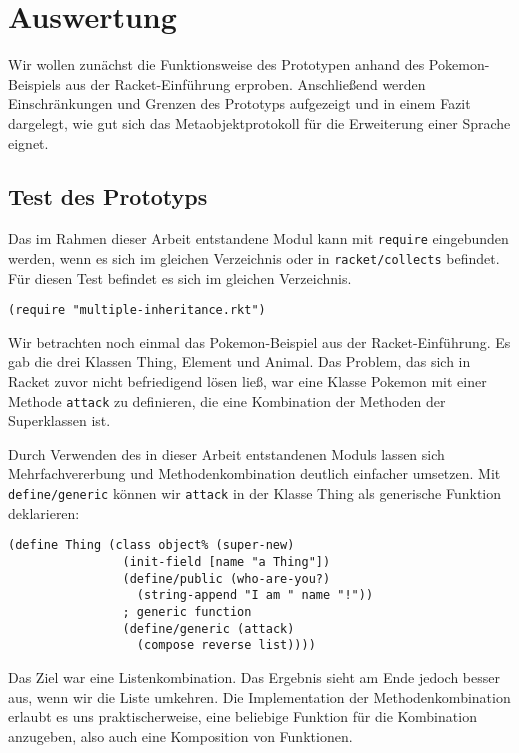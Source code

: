 \chapter{Auswertung}
Wir wollen zunächst die Funktionsweise des Prototypen anhand des Pokemon-Beispiels aus der Racket-Einführung erproben. Anschließend werden Einschränkungen und Grenzen des Prototyps aufgezeigt und in einem Fazit dargelegt, wie gut sich das Metaobjektprotokoll für die Erweiterung einer Sprache eignet.

\section{Test des Prototyps}
Das im Rahmen dieser Arbeit entstandene Modul kann mit \texttt{require} eingebunden werden, wenn es sich im gleichen Verzeichnis oder in \texttt{racket/collects} befindet. Für diesen Test befindet es sich im gleichen Verzeichnis.

\begin{lstlisting}
(require "multiple-inheritance.rkt")
\end{lstlisting}

Wir betrachten noch einmal das Pokemon-Beispiel aus der Racket-Einführung. Es gab die drei Klassen Thing, Element und Animal. Das Problem, das sich in Racket zuvor nicht befriedigend lösen ließ, war eine Klasse Pokemon mit einer Methode \texttt{attack} zu definieren, die eine Kombination der Methoden der Superklassen ist. 

Durch Verwenden des in dieser Arbeit entstandenen Moduls lassen sich Mehrfachvererbung und Methodenkombination deutlich einfacher umsetzen. Mit \texttt{define/generic} können wir \texttt{attack} in der Klasse Thing als generische Funktion deklarieren:

\begin{lstlisting}
(define Thing (class object% (super-new)
                (init-field [name "a Thing"])
                (define/public (who-are-you?)
                  (string-append "I am " name "!"))
                ; generic function
                (define/generic (attack)
                  (compose reverse list))))
\end{lstlisting}

Das Ziel war eine Listenkombination. Das Ergebnis sieht am Ende jedoch besser aus, wenn wir die Liste umkehren. Die Implementation der Methodenkombination erlaubt es uns praktischerweise, eine beliebige Funktion für die Kombination anzugeben, also auch eine Komposition von Funktionen.

